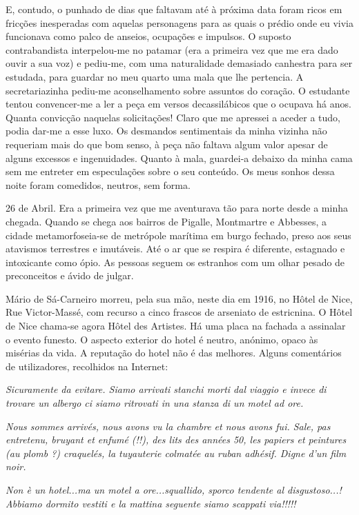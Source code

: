 E, contudo, o punhado de dias que faltavam até à próxima data foram
ricos em fricções inesperadas com aquelas personagens para as quais o
prédio onde eu vivia funcionava como
palco de anseios, ocupações e impulsos. O suposto contrabandista
interpelou-me no patamar (era a primeira vez que me era dado ouvir a sua
voz) e pediu-me, com uma naturalidade demasiado canhestra para ser
estudada, para guardar no meu quarto uma mala que lhe pertencia. A
secretariazinha pediu-me aconselhamento sobre assuntos do coração. O estudante tentou
convencer-me a ler a peça em versos decassilábicos que o ocupava há
anos. Quanta convicção naquelas solicitações! Claro que me apressei a
aceder a tudo, podia dar-me a esse luxo. Os desmandos sentimentais da
minha vizinha não requeriam mais do que bom senso, à peça não faltava
algum valor apesar de alguns excessos e ingenuidades. Quanto à mala,
guardei-a debaixo da minha cama sem me entreter em especulações sobre o
seu conteúdo. Os meus sonhos dessa noite foram comedidos, neutros, sem
forma.

26 de Abril. Era a primeira vez que me aventurava tão para norte desde a
minha chegada. Quando se chega aos bairros de Pigalle, Montmartre e
Abbesses, a cidade metamorfoseia-se de metrópole marítima em burgo
fechado, preso aos seus atavismos terrestres e imutáveis. Até o ar que
se respira é diferente, estagnado e intoxicante como ópio. As pessoas
seguem os estranhos com um olhar pesado de preconceitos e ávido de
julgar.

Mário de Sá-Carneiro morreu, pela sua mão, neste dia em 1916, no Hôtel
de Nice, Rue Victor-Massé, com recurso a cinco frascos de arseniato de
estricnina. O Hôtel de Nice chama-se agora Hôtel des Artistes. Há uma
placa na fachada a assinalar o evento funesto. O aspecto exterior do
hotel é neutro, anónimo, opaco às misérias da vida. A reputação do hotel
não é das melhores. Alguns comentários de utilizadores, recolhidos na
Internet:



\emph{Sicuramente da evitare. Siamo arrivati stanchi morti dal viaggio e
invece di trovare un albergo ci siamo ritrovati in una stanza di un
motel ad ore.}

\emph{Nous sommes arrivés, nous avons vu la chambre et nous avons fui.
Sale, pas entretenu, bruyant et enfumé (!!), des lits des années 50, les
papiers et peintures (au plomb ?) craquelés, la tuyauterie colmatée au
ruban adhésif. Digne d'un film noir.}

\emph{Non è un hotel...ma un motel a ore...squallido, sporco tendente
al disgustoso...! Abbiamo dormito vestiti e la mattina seguente siamo
scappati via!!!!!}

